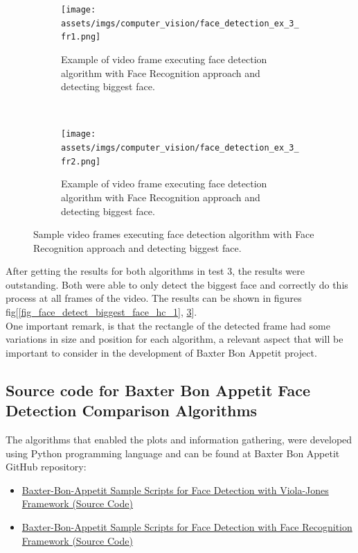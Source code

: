 \documentclass[11pt]{report} %
\begin{document}
\begin{figure}[H]
	\centering
	\begin{subfigure}{.5\textwidth}
		\centering
		\texttt{[image: assets/imgs/computer\_vision/face\_detection\_ex\_3\_fr1.png]}
		\caption{Example of video frame executing face detection algorithm with Face Recognition approach and detecting biggest face.}
		\label{fig_face_detect_biggest_face_fr_1_a}
	\end{subfigure}~
	\begin{subfigure}{.5\textwidth}
		\centering
		\texttt{[image: assets/imgs/computer\_vision/face\_detection\_ex\_3\_fr2.png]}
		\caption{Example of video frame executing face detection algorithm with Face Recognition approach and detecting biggest face.}
		\label{fig_face_detect_biggest_face_fr_1_b}
	\end{subfigure}%
	\caption{Sample video frames executing face detection algorithm with Face Recognition approach and detecting biggest face.}
	\label{fig_face_detect_biggest_face_fr_1}
\end{figure}


After getting the results for both algorithms in test 3, the results were outstanding. Both were able to only detect the biggest face and correctly do this process at all frames of the video. The results can be shown in figures fig[\ref{fig_face_detect_biggest_face_hc_1}, \ref{fig_face_detect_biggest_face_fr_1}].\\

One important remark, is that the rectangle of the detected frame had some variations in size and position for each algorithm, a relevant aspect that will be important to consider in the development of Baxter Bon Appetit project.\\


\subsection{Source code for Baxter Bon Appetit Face Detection Comparison Algorithms}

The algorithms that enabled the plots and information gathering, were developed using Python programming language and can be found at Baxter Bon Appetit GitHub repository:

\begin{itemize}
    \color{blue}
    \item \href{https://github.com/san99tiago/baxter-bon-appetit/blob/main/python/computer_vision/face_detect_haar_cascade/samples}{Baxter-Bon-Appetit Sample Scripts for Face Detection with Viola-Jones Framework (Source Code)}
    \color{blue}
    \item \href{https://github.com/san99tiago/baxter-bon-appetit/blob/main/python/computer_vision/face_detect_face_recognition/samples}{Baxter-Bon-Appetit Sample Scripts for Face Detection with Face Recognition Framework (Source Code)}
\end{itemize}
\end{document}
